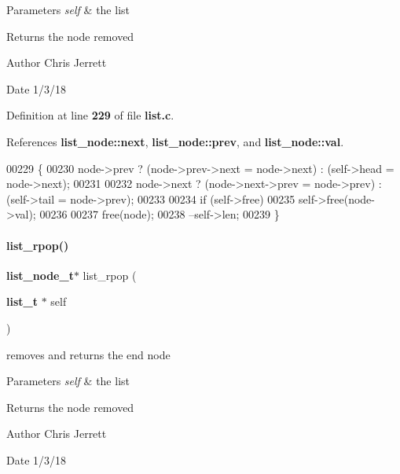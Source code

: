 \begin{DoxyParams}{Parameters}
{\em self} & the list \\
\hline
\end{DoxyParams}
\begin{DoxyReturn}{Returns}
the node removed 
\end{DoxyReturn}
\begin{DoxyAuthor}{Author}
Chris Jerrett 
\end{DoxyAuthor}
\begin{DoxyDate}{Date}
1/3/18 
\end{DoxyDate}


Definition at line \textbf{ 229} of file \textbf{ list.\+c}.



References \textbf{ list\+\_\+node\+::next}, \textbf{ list\+\_\+node\+::prev}, and \textbf{ list\+\_\+node\+::val}.


\begin{DoxyCode}
00229                                                   \{
00230   node->prev ? (node->prev->next = node->next) : (self->head = node->next);
00231 
00232   node->next ? (node->next->prev = node->prev) : (self->tail = node->prev);
00233 
00234   \textcolor{keywordflow}{if} (self->free)
00235     \textcolor{keyword}{self}->free(node->val);
00236 
00237   free(node);
00238   --\textcolor{keyword}{self}->len;
00239 \}
\end{DoxyCode}
\mbox{\label{list_8c_a53460b319b561ce2201bbf95450f1af7}} 
\paragraph{list\+\_\+rpop()}
{\footnotesize\ttfamily \textbf{ list\+\_\+node\+\_\+t}$\ast$ list\+\_\+rpop (\begin{DoxyParamCaption}\item[{\textbf{ list\+\_\+t} $\ast$}]{self }\end{DoxyParamCaption})}



removes and returns the end node 


\begin{DoxyParams}{Parameters}
{\em self} & the list \\
\hline
\end{DoxyParams}
\begin{DoxyReturn}{Returns}
the node removed 
\end{DoxyReturn}
\begin{DoxyAuthor}{Author}
Chris Jerrett 
\end{DoxyAuthor}
\begin{DoxyDate}{Date}
1/3/18 
\end{DoxyDate}


